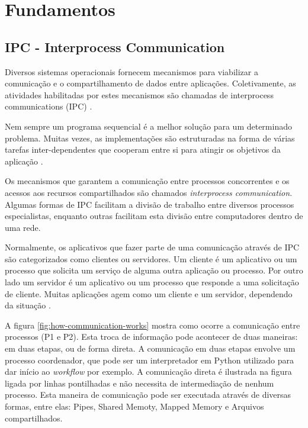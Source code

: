 \chapter[Fundamentos]{Fundamentos}

\section{IPC - Interprocess Communication}\label{sec:ipc}


Diversos sistemas operacionais fornecem mecanismos para viabilizar a comunicação e o compartilhamento de dados entre aplicações. Coletivamente, as atividades habilitadas por estes mecanismos são chamadas de interprocess communications (IPC) \cite{microsoft-ipc}.

Nem sempre um programa sequencial é a melhor solução para um determinado problema. Muitas vezes, as implementações são estruturadas na forma de várias tarefas inter-dependentes que cooperam entre si para atingir os objetivos da aplicação \cite{sistemas-op-mazierro}.

Os mecanismos que garantem a comunicação entre processos concorrentes e os acessos aos recursos compartilhados são chamados \textit{interprocess communication}. Algumas formas de IPC facilitam a divisão de trabalho entre diversos processos especialistas, enquanto outras  facilitam esta divisão entre computadores dentro de uma rede.

Normalmente, os aplicativos que fazer parte de uma comunicação através de IPC são categorizados como clientes ou servidores. Um cliente é um aplicativo ou um processo que solicita um serviço de alguma outra aplicação ou processo. Por outro lado um servidor é um aplicativo ou um processo que responde a uma solicitação de cliente. Muitas aplicações agem como um cliente e um servidor, dependendo da situação \cite{microsoft-ipc}.

A figura \ref{fig:how-communication-works} mostra como ocorre a comunicação entre processos (P1 e P2). Esta troca de informação pode acontecer de duas maneiras: em duas etapas, ou de forma direta. A comunicação em duas etapas envolve um processo coordenador, que pode ser um interpretador em Python utilizado para dar início ao \textit{workflow} por exemplo. A comunicação direta é ilustrada na figura ligada por linhas pontilhadas e não necessita de intermediação de nenhum processo. Esta maneira de comunicação pode ser executada através de diversas formas, entre elas: Pipes, Shared Memoty, Mapped Memory e Arquivos compartilhados.

